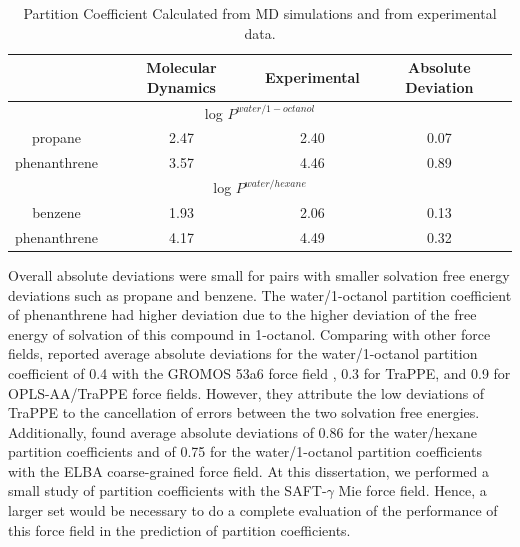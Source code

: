 \begin{table}[H]
	\centering
	\caption{Partition Coefficient Calculated from MD simulations and from experimental data.}
	\label{tbl:part}
	\begin{tabular}{cccc}
		\hline\hline
		& {Molecular Dynamics} & {Experimental} & Absolute Deviation \\ \hline
		\multicolumn{4}{c}{log $P^{water/1-octanol}$}               \\ \hline
		propane      & 2.47                 & 2.40           & 0.07               \\
		phenanthrene & 3.57                 & 4.46           & 0.89               \\ \hline
		\multicolumn{4}{c}{log $P^{water/hexane}$}                 \\ \hline
		benzene      & 1.93                 & 2.06           & 0.13               \\
		phenanthrene & 4.17                 & 4.49           & 0.32               \\
		\hline\hline
	\end{tabular}
	
\end{table}

Overall absolute deviations were small for pairs with smaller solvation free energy deviations such as propane and benzene. The water/1-octanol partition coefficient of phenanthrene had higher deviation due to the higher deviation of the free energy of solvation of this compound in 1-octanol. Comparing with other force fields,  reported average absolute deviations for the water/1-octanol partition coefficient of 0.4 with the GROMOS 53a6 force field \cite{JCC:JCC20090}, 0.3 for TraPPE, and 0.9 for OPLS-AA/TraPPE force fields. However, they attribute the low deviations of TraPPE to the cancellation of errors between the two solvation free energies. Additionally,  found average absolute deviations of 0.86 for the water/hexane partition coefficients and of 0.75 for the water/1-octanol partition coefficients with the ELBA coarse-grained force field. At this dissertation, we performed a small study of partition coefficients with the SAFT-$\gamma$ Mie force field. Hence, a larger set would be necessary to do a complete evaluation of the performance of this force field in the prediction of partition coefficients. 